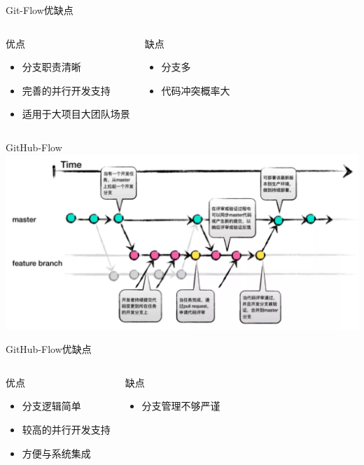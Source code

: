\begin{frame}[t]{Git-Flow}{优缺点}
    \begin{columns}[onlytextwidth]
        \begin{alertblock}{优点}
            \begin{itemize}
                \item 分支职责清晰
                \item 完善的并行开发支持
                \item 适用于大项目大团队场景
            \end{itemize}
        \end{alertblock}
        \begin{exampleblock}{缺点}
            \begin{itemize}
                \item 分支多
                \item 代码冲突概率大
            \end{itemize}
        \end{exampleblock}
    \end{columns}
\end{frame}

\begin{frame}{GitHub-Flow}
    \centering
    \includegraphics[height=30ex,width=48ex]{figures/github-flow.png}
\end{frame}

\begin{frame}[t]{GitHub-Flow}{优缺点}
    \begin{columns}[onlytextwidth]
        \begin{alertblock}{优点}
            \begin{itemize}
                \item 分支逻辑简单
                \item 较高的并行开发支持
                \item 方便与系统集成
            \end{itemize}
        \end{alertblock}
        \begin{exampleblock}{缺点}
            \begin{itemize}
                \item 分支管理不够严谨
            \end{itemize}
        \end{exampleblock}
    \end{columns}
\end{frame}

